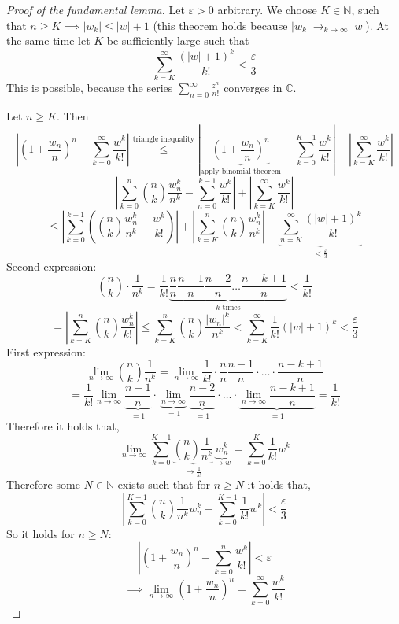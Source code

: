 \documentclass[a4paper,landscape,twocolumn]{article}
\theoremstyle{definition}
\newcommand\abs[1]{\left|#1\right|}
\begin{document}
\begin{proof}[Proof of the fundamental lemma]
  Let $\varepsilon > 0$ arbitrary. We choose $K \in \mathbb N$, such that
  $n \geq K \implies \abs{w_k} \leq \abs{w} + 1$
  (this theorem holds because $\abs{w_k} \to_{k\to\infty} \abs{w}$).
  At the same time let $K$ be sufficiently large such that
  \[ \sum_{k=K}^\infty \frac{\left(\abs{w} + 1\right)^k}{k!} < \frac{\varepsilon}{3} \]
  This is possible, because the series $\sum_{n=0}^\infty \frac{z^n}{n!}$ converges in $\mathbb C$.

  Let $n \geq K$. Then
  \[
    \abs{\left(1 + \frac{w_n}{n}\right)^{n} - \sum_{k=0}^\infty \frac{w^k}{k!}}
    \overset{\text{triangle inequality}}{\leq}
    \abs{
      \underbrace{\left(1 + \frac{w_n}{n}\right)^n}_{\text{apply binomial theorem}}
      - \sum_{k=0}^{K-1} \frac{w^k}{k!}
    } + \abs{\sum_{k=K}^{\infty} \frac{w^k}{k!}}
  \] \[
    \abs{\sum_{k=0}^n \binom nk \frac{w_n^k}{n^k} - \sum_{n=0}^{k-1} \frac{w^k}{k!}}
    + \abs{\sum_{k=K}^\infty \frac{w^k}{k!}}
  \] \[
    \leq \abs{\sum_{k=0}^{k-1} \left(\binom nk \frac{w_n^k}{n^k} - \frac{w^k}{k!}\right)}
    + \abs{\sum_{k=K}^n \binom nk \frac{w_n^k}{n^k}}
    + \underbrace{\sum_{n=K}^\infty \frac{(\abs{w} + 1)^k}{k!}}_{< \frac\varepsilon3}
  \]
  Second expression:
  \[
    \binom nk \cdot \frac{1}{n^k}
    = \frac1{k!} \underbrace{\frac nn \frac{n-1}{n} \frac{n-2}{n} \ldots \frac{n-k+1}{n}}_{k \text{ times}} < \frac1{k!}
  \] \[
    = \abs{\sum_{k=K}^n \binom nk \frac{w_n^k}{k!}}
    \leq \sum_{k=K}^n \binom nk \frac{\abs{w_n}^k}{n^k}
    < \sum_{k=K}^\infty \frac1{k!}(\abs{w} + 1)^k < \frac\varepsilon3
  \]
  First expression:
  \[
    \lim_{n\to\infty} \binom nk \frac1{n^k}
      = \lim_{n\to\infty} \frac1{k!} \cdot \frac nn \frac{n-1}{n} \cdot \ldots \cdot \frac{n-k+1}{n}
  \] \[
    = \frac1{k!} \lim_{n\to\infty} \underbrace{\frac{n-1}{n}}_{=1} \cdot \underbrace{\lim_{n\to\infty}}_{=1}
    \underbrace{\frac{n-2}{n}}_{=1} \cdot \ldots \cdot \underbrace{\lim_{n\to\infty} \frac{n-k+1}{n}}_{=1}
    = \frac1{k!}
  \]
  Therefore it holds that,
  \[ \lim_{n\to\infty} \sum_{k=0}^{K-1} \underbrace{\binom nk \frac{1}{n^k}}_{\to \frac1{k!}} \underbrace{w_n^k}_{\to w} = \sum_{k=0}^K \frac{1}{k!} w^k \]
  Therefore some $N \in \mathbb N$ exists such that for $n \geq N$ it holds that,
  \[ \abs{\sum_{k=0}^{K-1} \binom nk \frac{1}{n^k} w_n^k - \sum_{k=0}^{K-1} \frac1{k!} w^k} < \frac{\varepsilon}{3} \]
  So it holds for $n \geq N$:
  \[ \abs{\left(1 + \frac{w_n}{n}\right)^n - \sum_{k=0}^n \frac{w^k}{k!}} < \varepsilon \]
  \[ \implies \lim_{n\to\infty} \left(1 + \frac{w_n}{n}\right)^n = \sum_{k=0}^\infty \frac{w^k}{k!} \]
\end{proof}
\end{document}
